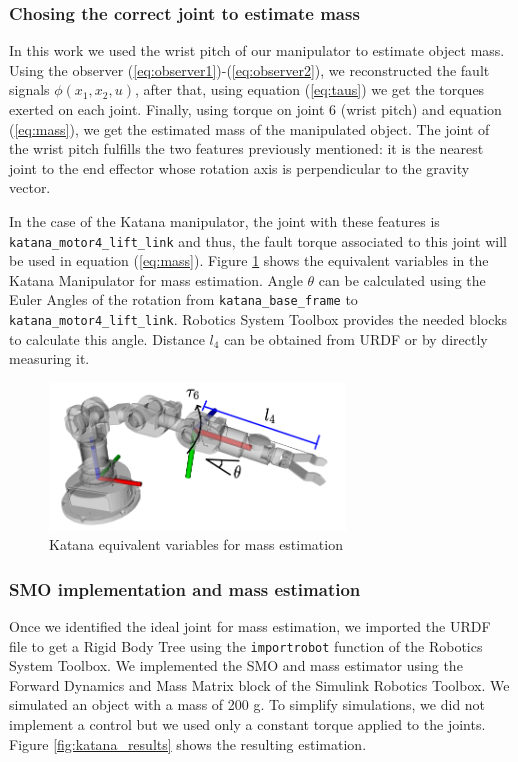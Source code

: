 \documentclass[smallextended]{svjour3}       %
\begin{document}
\subsubsection*{Chosing the correct joint to estimate mass}
In this work we used the wrist pitch of our manipulator to estimate object mass. Using the observer (\ref{eq:observer1})-(\ref{eq:observer2}), we reconstructed the fault signals $\phi(x_1, x_2, u)$, after that, using equation (\ref{eq:taus}) we get the torques exerted on each joint. Finally, using torque on joint 6 (wrist pitch) and equation (\ref{eq:mass}), we get the estimated mass of the manipulated object. The joint of the wrist pitch fulfills the two features previously mentioned: it is the nearest joint to the end effector whose rotation axis is perpendicular to the gravity vector.

In the case of the Katana manipulator, the joint with these features is \texttt{katana\_motor4\_lift\_link} and thus, the fault torque associated to this joint will be used in equation (\ref{eq:mass}). Figure \ref{fig:katana_joints} shows the equivalent variables in the Katana Manipulator for mass estimation. Angle $\theta$ can be calculated using the Euler Angles of the rotation from \texttt{katana\_base\_frame} to \texttt{katana\_motor4\_lift\_link}. Robotics System Toolbox provides the needed blocks to calculate this angle. Distance $l_4$ can be obtained from URDF or by directly measuring it. 

\begin{figure}
  \centering
  \includegraphics[width=0.7\textwidth]{Figures/katana_joints.png}
  \caption{Katana equivalent variables for mass estimation}
  \label{fig:katana_joints}
\end{figure}

\subsubsection*{SMO implementation and mass estimation}
Once we identified the ideal joint for mass estimation, we imported the URDF file to get a Rigid Body Tree using the \texttt{importrobot} function of the Robotics System Toolbox. We implemented the SMO and mass estimator using the Forward Dynamics and Mass Matrix block of the Simulink Robotics Toolbox. We simulated an object with a mass of 200 g. To simplify simulations, we did not implement a control but we used only a constant torque applied to the joints. Figure \ref{fig:katana_results} shows the resulting estimation. 
\end{document}
